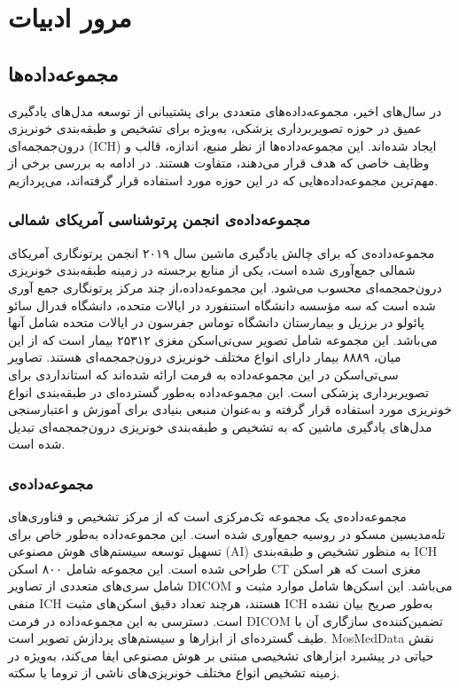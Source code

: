 \chapter{مرور ادبیات}

\section{مجموعه‌داده‌ها}


در سال‌های اخیر، مجموعه‌داده‌های متعددی برای پشتیبانی از توسعه مدل‌های یادگیری عمیق در حوزه تصویربرداری پزشکی، به‌ویژه برای تشخیص و طبقه‌بندی خونریزی درون‌جمجمه‌ای (ICH) ایجاد شده‌اند. این مجموعه‌داده‌ها از نظر منبع، اندازه، قالب و وظایف خاصی که هدف قرار می‌دهند، متفاوت هستند. در ادامه به بررسی برخی از مهم‌ترین مجموعه‌داده‌هایی که در این حوزه مورد استفاده قرار گرفته‌اند، می‌پردازیم.

\subsection{مجموعه‌داده‌ی انجمن پرتوشناسی آمریکای شمالی
 }
مجموعه‌داده‌ی 
\cite{rsna_hemorrhage_detection_kaggle,rsna_kaggle}
 که برای چالش یادگیری ماشین سال ۲۰۱۹ انجمن پرتونگاری آمریکای شمالی جمع‌آوری شده است، یکی از منابع برجسته در زمینه طبقه‌بندی خونریزی درون‌جمجمه‌ای محسوب می‌شود. این مجموعه‌داده،از چند مرکز پرتونگاری جمع آوری شده است که سه مؤسسه دانشگاه استنفورد در ایالات متحده، دانشگاه فدرال سائو پائولو در برزیل و بیمارستان دانشگاه توماس جفرسون در ایالات متحده شامل آنها می‌باشد. این مجموعه شامل تصویر سی‌تی‌اسکن مغزی ۲۵۳۱۲ بیمار است که از این میان، ۸۸۸۹ بیمار دارای انواع مختلف خونریزی درون‌جمجمه‌ای هستند. تصاویر سی‌تی‌اسکن در این مجموعه‌داده به فرمت
  ارائه شده‌اند که استانداردی برای تصویربرداری پزشکی است. این مجموعه‌داده به‌طور گسترده‌ای در طبقه‌بندی انواع خونریزی مورد استفاده قرار گرفته و به‌عنوان منبعی بنیادی برای آموزش و اعتبارسنجی مدل‌های یادگیری ماشین که به تشخیص و طبقه‌بندی خونریزی درون‌جمجمه‌ای تبدیل شده است.

\subsection{مجموعه‌داده‌ی }
مجموعه‌داده‌ی
 \cite{medmos_khoruzhaya2024expanded}
  یک مجموعه تک‌مرکزی است که از مرکز تشخیص و فناوری‌های تله‌مدیسین مسکو در روسیه جمع‌آوری شده است. این مجموعه‌داده به‌طور خاص برای تسهیل توسعه سیستم‌های هوش مصنوعی (AI) به منظور تشخیص و طبقه‌بندی ICH طراحی شده است. این مجموعه شامل ۸۰۰ اسکن CT مغزی است که هر اسکن شامل سری‌های متعددی از تصاویر DICOM می‌باشد. این اسکن‌ها شامل موارد مثبت و منفی ICH هستند، هرچند تعداد دقیق اسکن‌های مثبت ICH به‌طور صریح بیان نشده است. دسترسی به این مجموعه‌داده در فرمت DICOM تضمین‌کننده‌ی سازگاری آن با طیف گسترده‌ای از ابزارها و سیستم‌های پردازش تصویر است. MosMedData نقش حیاتی در پیشبرد ابزارهای تشخیصی مبتنی بر هوش مصنوعی ایفا می‌کند، به‌ویژه در زمینه تشخیص انواع مختلف خونریزی‌های ناشی از تروما یا سکته.

